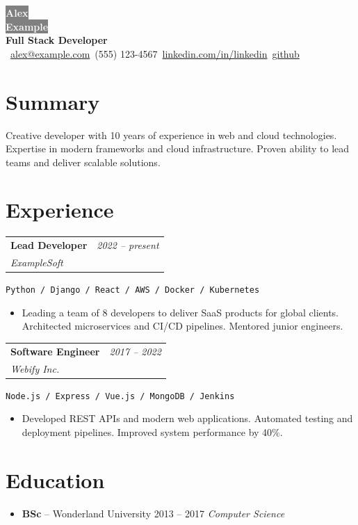 \documentclass[10pt]{article}
\makeatletter
\newcommand{\tech}[1]{\textcolor{secondary}{\textbf{#1}}}
\newcommand{\experience}[4]{%
  \vspace{4pt}
  \begin{tabular*}{\textwidth}{@{}l@{\extracolsep{\fill}}r@{}}
    \textbf{#1} & \textit{#2} \\
    \textit{\small#3} & \textit{\small#4}
  \end{tabular*}
  \vspace{-4pt}
}
\makeatother
\begin{document}
\begin{center}
\colorbox{gray}{\HUGE\textcolor{white}{\textbf{Alex}}} \\[2pt]
\colorbox{gray}{\HUGE\textcolor{white}{\textbf{Example}}} \\[6pt]
    {\Large \tech{Full Stack Developer}} \\[6pt]
    ~\href{mailto:alex@example.com}{alex@example.com}\hfill {}~(555) 123-4567\hfill {}~\href{https://www.linkedin.com/company/linkedin/}{linkedin.com/in/linkedin}\hfill {}~\href{https://github.com/github}{github}
\end{center}

\section*{Summary}

Creative developer with 10 years of experience in web and cloud technologies. Expertise in modern frameworks and cloud infrastructure. Proven ability to lead teams and deliver scalable solutions.

\section*{Experience}

\experience{Lead Developer}{2022 -- present}{ExampleSoft}{}
\hspace{0.5cm}\texttt{Python / Django / React / AWS / Docker / Kubernetes}
\begin{itemize}
    \item Leading a team of 8 developers to deliver SaaS products for global clients. Architected microservices and CI/CD pipelines. Mentored junior engineers.
\end{itemize}

\experience{Software Engineer}{2017 -- 2022}{Webify Inc.}{}
\hspace{0.5cm}\texttt{Node.js / Express / Vue.js / MongoDB / Jenkins}
\begin{itemize}
    \item Developed REST APIs and modern web applications. Automated testing and deployment pipelines. Improved system performance by 40\%.
\end{itemize}

\section*{Education}
\begin{itemize}
    \item \tech{BSc} -- Wonderland University \hfill 2013 -- 2017
    \textit{\small Computer Science}
\end{itemize}
\end{document}
